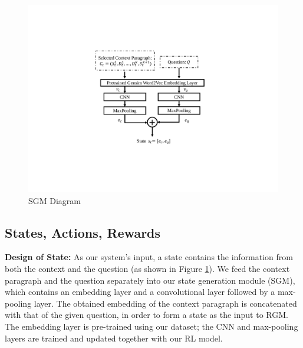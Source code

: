 \begin{figure}\centering
\begin{minipage}{.45\textwidth}
 \includegraphics[width=0.9\linewidth]{fig/fig1_2.pdf}
 \caption{SGM Diagram}
 \label{fig:sgmDiagram}
\end{minipage}
\vspace{-2ex}
\end{figure}

\subsection{States, Actions, Rewards}\label{sec:design}

\textbf{Design of State:} As our system's input, a state contains the information from both the context and the question (as shown in Figure \ref{fig:sgmDiagram}). %
We feed the context paragraph and the question separately into our state generation module (SGM), which contains an embedding layer and a convolutional layer followed by a max-pooling layer. The obtained embedding of the context paragraph is concatenated with that of the given question, in order to form a state as the input to RGM. The embedding layer is pre-trained using our dataset; the CNN and max-pooling layers are trained and updated together with our RL model. %
 
